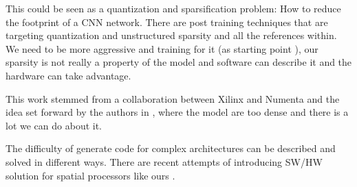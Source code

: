 \documentclass[sigconf]{acmart}
\begin{document}
This could be seen as a quantization and sparsification problem: How
to reduce the footprint of a CNN network. There are post training
techniques that are targeting quantization and unstructured sparsity
\cite{frantar2023gptq} and all the references within. We need to be
more aggressive and training for it (as starting point
\cite{abs-2102-11289}), our sparsity is not really a property of the
model and software can describe it and the hardware can take
advantage.

This work stemmed from a collaboration between Xilinx and Numenta and
the idea set forward by the authors in \cite{ahmad2019dense}, where
the model are too dense and there is a lot we can do about
it. 


The difficulty of generate code for complex architectures can be
described and solved in different ways. There are recent attempts of
introducing SW/HW solution for spatial processors like ours
\cite{Huang2021CoSASB,Russo2023MemoryAwareDA,Cai2023InterlayerSS}. 
\end{document}
